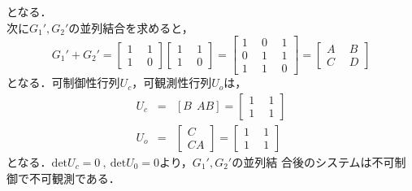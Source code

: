 \documentclass[a4paper,12pt]{jarticle}
\begin{document}
%
となる．\\
次に$G_1',G_2'$の並列結合を求めると，
%
\begin{equation}
 G_1'+G_2'=\left[
  \begin{array}{c|c}
   1 ~&~ 1  \\ \hline
   1 ~&~ 0    
  \end{array}
  \right] \left[
  \begin{array}{c|c}
  1 ~&~ 1  \\ \hline
  1 ~&~ 0    
  \end{array}
  \right]=\left[
  \begin{array}{cc|c}
  1 ~&~  0 ~&~ 1  \\ 
  0 ~&~  1 ~&~ 1  \\\hline
  1 ~&~  1 ~&~ 0
  \end{array}
  \right]=\left[
  \begin{array}{c|c}
  A ~&~ B  \\ \hline
  C ~&~ D    
  \end{array}
  \right]
  \end{equation}
%
となる．可制御性行列$U_c$，可観測性行列$U_o$は，
%
\begin{eqnarray}
 U_c&=&[B~~AB]=\left[
  \begin{array}{cc}
  1 ~&~ 1  \\ 
  1 ~&~ 1    
  \end{array}
\right] \\
 U_o&=&\left[
  \begin{array}{c}
  C \\ 
  CA     
  \end{array}
\right]=\left[
  \begin{array}{cc}
  1  ~&~ 1  \\ 
  1 ~&~ 1    
  \end{array}
\right] 
\end{eqnarray}
%
となる．$\mathrm{det}U_c=0~,~\mathrm{det}U_0=0$より，$G_1',G_2'$の並列結
合後のシステムは不可制御で不可観測である．
\end{document}
